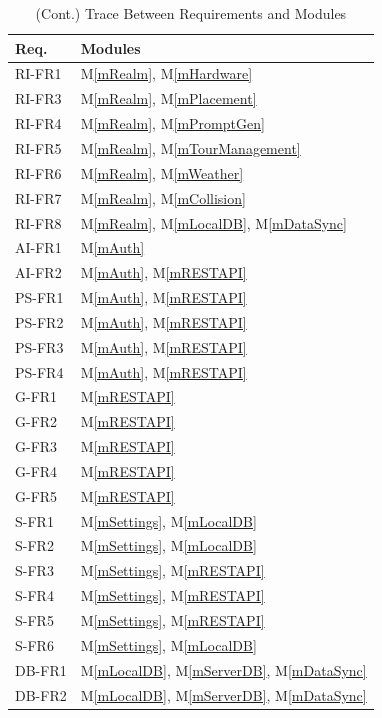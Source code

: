\documentclass[12pt, titlepage]{article}
\newcommand{\mref}[1]{M\ref{#1}}
\begin{document}
\begin{table}[H]
\centering
\begin{tabular}{p{} p{}}
\toprule
\textbf{Req.} & \textbf{Modules}\\
\midrule
RI-FR1 & \mref{mRealm}, \mref{mHardware}\\
RI-FR3 & \mref{mRealm}, \mref{mPlacement}\\
RI-FR4 & \mref{mRealm}, \mref{mPromptGen}\\
RI-FR5 & \mref{mRealm}, \mref{mTourManagement}\\
RI-FR6 & \mref{mRealm}, \mref{mWeather}\\
RI-FR7 & \mref{mRealm}, \mref{mCollision}\\
RI-FR8 & \mref{mRealm}, \mref{mLocalDB}, \mref{mDataSync}\\
AI-FR1 & \mref{mAuth}\\
AI-FR2 & \mref{mAuth}, \mref{mRESTAPI}\\
PS-FR1 & \mref{mAuth}, \mref{mRESTAPI}\\
PS-FR2 & \mref{mAuth}, \mref{mRESTAPI}\\
PS-FR3 & \mref{mAuth}, \mref{mRESTAPI}\\
PS-FR4 & \mref{mAuth}, \mref{mRESTAPI}\\
G-FR1 & \mref{mRESTAPI}\\
G-FR2 & \mref{mRESTAPI}\\
G-FR3 & \mref{mRESTAPI}\\
G-FR4 & \mref{mRESTAPI}\\
G-FR5 & \mref{mRESTAPI}\\
S-FR1 & \mref{mSettings}, \mref{mLocalDB}\\
S-FR2 & \mref{mSettings}, \mref{mLocalDB}\\
S-FR3 & \mref{mSettings}, \mref{mRESTAPI}\\
S-FR4 & \mref{mSettings}, \mref{mRESTAPI}\\
S-FR5 & \mref{mSettings}, \mref{mRESTAPI}\\
S-FR6 & \mref{mSettings}, \mref{mLocalDB}\\
DB-FR1 & \mref{mLocalDB}, \mref{mServerDB}, \mref{mDataSync}\\
DB-FR2 & \mref{mLocalDB}, \mref{mServerDB}, \mref{mDataSync}\\
\bottomrule
\end{tabular}
\caption{(Cont.) Trace Between Requirements and Modules}
\label{TblRT}
\end{table}
\end{document}
